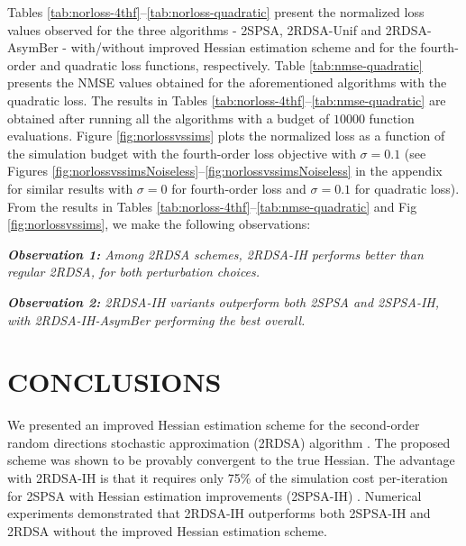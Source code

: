 \documentclass[letterpaper, 10 pt, conference]{ieeeconf}  %
\begin{document}
Tables \ref{tab:norloss-4thf}--\ref{tab:norloss-quadratic} present the normalized loss values observed for the three algorithms - 2SPSA, 2RDSA-Unif and 2RDSA-AsymBer - with/without improved Hessian estimation scheme and for the fourth-order and quadratic loss functions, respectively. Table \ref{tab:nmse-quadratic} presents the NMSE values obtained for the aforementioned algorithms with the quadratic loss. The results in Tables \ref{tab:norloss-4thf}--\ref{tab:nmse-quadratic} are obtained after running all the algorithms with a budget of $10000$ function evaluations.
 Figure \ref{fig:norlossvssims} plots the normalized loss as a function of the simulation budget with the fourth-order loss objective with $\sigma=0.1$ (see Figures \ref{fig:norlossvssimsNoiseless}--\ref{fig:norlossvssimsNoiseless} in the appendix for similar results with $\sigma = 0$ for fourth-order loss and $\sigma=0.1$ for quadratic loss). From the results in Tables \ref{tab:norloss-4thf}--\ref{tab:nmse-quadratic} and Fig \ref{fig:norlossvssims}, we make the following observations:
 
\textit{\textbf{Observation 1:} Among 2RDSA schemes, 2RDSA-IH performs better than regular 2RDSA, for both perturbation choices.}

\textit{\textbf{Observation 2:} 2RDSA-IH variants outperform both 2SPSA and 2SPSA-IH, with 2RDSA-IH-AsymBer performing the best overall.}






\section{CONCLUSIONS}
\label{sec:conclusions}
We presented an improved Hessian estimation scheme for the second-order random directions stochastic approximation (2RDSA) algorithm \cite{prashanth2015rdsa}. 
The proposed scheme was shown to be provably convergent to the true Hessian.
The advantage with 2RDSA-IH is that it requires only 75\% of the simulation cost per-iteration for 2SPSA with Hessian estimation improvements (2SPSA-IH) \cite{spall-jacobian}. 
Numerical experiments demonstrated that 2RDSA-IH outperforms both 2SPSA-IH and 2RDSA without the improved Hessian estimation scheme.

\end{document}
